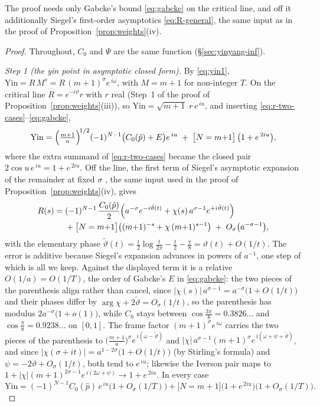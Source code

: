 \documentclass[11pt]{article}
\theoremstyle{definition}
\begin{document}
The proof needs only Gabcke's bound \eqref{eq:gabcke} on the critical
line, and off it additionally Siegel's first-order asymptotics
\eqref{eq:R-general}, the same input as in the proof of
Proposition~\ref{prop:weights}(iv).

\begin{proof}
Throughout, $C_0$ and $\Psi$ are the same function
(\S\ref{sec:yinyang-inf}).

\emph{Step 1 (the yin point in asymptotic closed form).} By
\eqref{eq:yin1}, $\mathrm{Yin}=R\,M^{s}=R\,(m+1)^{\sigma}e^{\,i\omega}$,
with $M=m+1$ for non-integer $T$. On the critical line $R=e^{-i\vartheta}r$
with $r$ real (Step~1 of the proof of
Proposition~\ref{prop:weights}(iii)), so
$\mathrm{Yin}=\sqrt{m+1}\;r\,e^{\,iu}$, and inserting
\eqref{eq:r-two-cases}--\eqref{eq:gabcke},
\begin{equation}\label{eq:yin-asymp}
\mathrm{Yin}
=\Bigl(\tfrac{m+1}{a}\Bigr)^{\!1/2}(-1)^{N-1}\bigl(C_0(\hat p)+E\bigr)
e^{\,iu}
\;+\;\bigl[N=m{+}1\bigr]\,\bigl(1+e^{\,2iu}\bigr),
\end{equation}
where the extra summand of \eqref{eq:r-two-cases} became the closed pair
$2\cos u\,e^{\,iu}=1+e^{\,2iu}$. Off the line, the first term of
Siegel's asymptotic expansion of the remainder at fixed $\sigma$
\cite{Siegel1932}, the same input used in the proof of
Proposition~\ref{prop:weights}(iv), gives
\begin{equation}\label{eq:R-general}
\begin{split}
R(s)={}&(-1)^{N-1}\,\frac{C_0(\hat p)}{2}
\Bigl(a^{-\sigma}e^{-i\tilde\vartheta(t)}
+\chi(s)\,a^{\sigma-1}e^{+i\tilde\vartheta(t)}\Bigr)\\
&+\bigl[N=m{+}1\bigr]\bigl((m{+}1)^{-s}+\chi\,(m{+}1)^{s-1}\bigr)
\;+\;O_\sigma\bigl(a^{-\sigma-1}\bigr),
\end{split}
\end{equation}
with the elementary phase
$\tilde\vartheta(t)=\tfrac t2\log\tfrac t{2\pi}-\tfrac t2-\tfrac\pi8
=\vartheta(t)+O(1/t)$. The error is additive because Siegel's expansion
advances in powers of $a^{-1}$, one step of which is all we keep. Against
the displayed term it is a relative $O(1/a)=O(1/T)$, the order of Gabcke's
$E$ in \eqref{eq:gabcke}: the two pieces of the parenthesis align rather
than cancel, since $|\chi(s)|\,a^{\sigma-1}=a^{-\sigma}\bigl(1+O(1/t)\bigr)$
and their phases differ by $\arg\chi+2\tilde\vartheta=O_\sigma(1/t)$, so the
parenthesis has modulus $2a^{-\sigma}\bigl(1+o(1)\bigr)$, while $C_0$ stays
between $\cos\tfrac{3\pi}{8}=0.3826\ldots$ and $\cos\tfrac\pi8=0.9238\ldots$
on $[0,1]$. The frame factor $(m+1)^{\sigma}e^{\,i\omega}$
carries the two pieces of the parenthesis to
$\bigl(\tfrac{m+1}{a}\bigr)^{\sigma}e^{\,i(\omega-\tilde\vartheta)}$ and
$|\chi|\,a^{\sigma-1}(m+1)^{\sigma}e^{\,i(\omega+\psi+\tilde\vartheta)}$,
and since $|\chi(\sigma+it)|=a^{1-2\sigma}\bigl(1+O(1/t)\bigr)$ (by
Stirling's formula) and $\psi=-2\vartheta+O_\sigma(1/t)$, both tend to
$e^{\,iu}$; likewise the Iverson pair maps to
$1+|\chi|(m+1)^{2\sigma-1}e^{\,i(2\omega+\psi)}\to1+e^{\,2iu}$. In every
case
\[
\mathrm{Yin}=(-1)^{N-1}C_0(\hat p)\,e^{\,iu}\bigl(1+O_\sigma(1/T)\bigr)
+\bigl[N=m{+}1\bigr]\bigl(1+e^{\,2iu}\bigr)\bigl(1+O_\sigma(1/T)\bigr).
\]


\end{proof}
\end{document}
